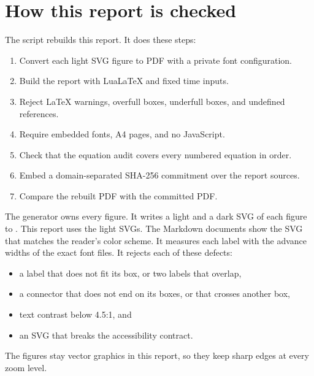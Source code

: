 \documentclass[11pt,a4paper]{article}
\theoremstyle{definition}
\begin{document}
\appendix
\section{How this report is checked}\label{app:verification}


The script  rebuilds this report. It does
these steps:
\begin{enumerate}[leftmargin=*]
  \item Convert each light SVG figure to PDF with a private font configuration.
  \item Build the report with LuaLaTeX and fixed time inputs.
  \item Reject LaTeX warnings, overfull boxes, underfull boxes, and undefined references.
  \item Require embedded fonts, A4 pages, and no JavaScript.
  \item Check that the equation audit covers every numbered equation in order.
  \item Embed a domain-separated SHA-256 commitment over the report sources.
  \item Compare the rebuilt PDF with the committed PDF.
\end{enumerate}

The generator  owns every figure. It writes a light and
a dark SVG of each figure to . This report uses the light SVGs. The
Markdown documents show the SVG that matches the reader's color scheme. It measures each label with the
advance widths of the exact font files. It rejects each of these defects:
\begin{itemize}[leftmargin=*]
  \item a label that does not fit its box, or two labels that overlap,
  \item a connector that does not end on its boxes, or that crosses another box,
  \item text contrast below 4.5:1, and
  \item an SVG that breaks the accessibility contract.
\end{itemize}
The figures stay vector graphics in this report, so they keep sharp edges at every zoom
level.
\end{document}

